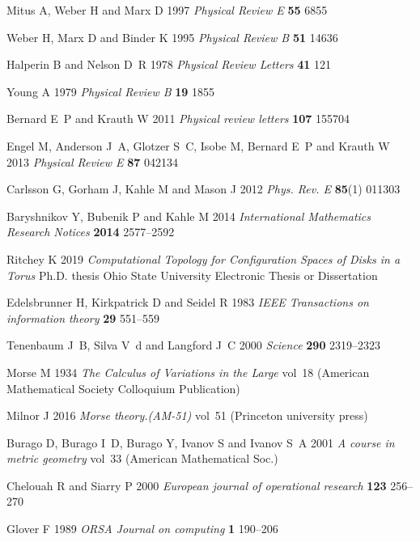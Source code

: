 \documentclass[default,iicol]{sn-jnl}%
\theoremstyle{thmstyleone}%
\theoremstyle{thmstyletwo}%
\theoremstyle{thmstylethree}%
\begin{document}
\begin{thebibliography}{10}
	Mitus A, Weber H and Marx D 1997 {\em Physical Review E\/} {\bf 55} 6855
	
	Weber H, Marx D and Binder K 1995 {\em Physical Review B\/} {\bf 51} 14636
	
	Halperin B and Nelson D~R 1978 {\em Physical Review Letters\/} {\bf 41} 121
	
	Young A 1979 {\em Physical Review B\/} {\bf 19} 1855
	
	Bernard E~P and Krauth W 2011 {\em Physical review letters\/} {\bf 107} 155704
	
	Engel M, Anderson J~A, Glotzer S~C, Isobe M, Bernard E~P and Krauth W 2013 {\em
		Physical Review E\/} {\bf 87} 042134
	
	Carlsson G, Gorham J, Kahle M and Mason J 2012 {\em Phys. Rev. E\/} {\bf 85}(1)
	011303
	
	Baryshnikov Y, Bubenik P and Kahle M 2014 {\em International Mathematics
		Research Notices\/} {\bf 2014} 2577–2592
	
	Ritchey K 2019 {\em Computational Topology for Configuration Spaces of Disks in
		a Torus\/} Ph.D. thesis Ohio State University Electronic Thesis or
	Dissertation
	
	Edelsbrunner H, Kirkpatrick D and Seidel R 1983 {\em IEEE Transactions on
		information theory\/} {\bf 29} 551–559
	
	Tenenbaum J~B, Silva V~d and Langford J~C 2000 {\em Science\/} {\bf 290}
	2319–2323
	
	Morse M 1934 {\em The Calculus of Variations in the Large\/} vol~18 (American
	Mathematical Society Colloquium Publication)
	
	Milnor J 2016 {\em Morse theory.(AM-51)\/} vol~51 (Princeton university press)
	
	Burago D, Burago I~D, Burago Y, Ivanov S and Ivanov S~A 2001 {\em A course in
		metric geometry\/} vol~33 (American Mathematical Soc.)
	
	Chelouah R and Siarry P 2000 {\em European journal of operational research\/}
	{\bf 123} 256–270
	
	Glover F 1989 {\em ORSA Journal on computing\/} {\bf 1} 190–206
	

\end{thebibliography}
\end{document}
